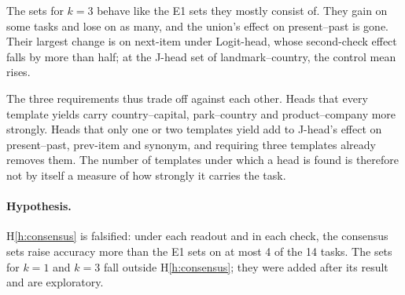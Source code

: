 \documentclass[11pt,a4paper]{article}
\begin{document}
The sets for $k=3$ behave like the E1 sets they mostly consist of. They gain on some tasks and lose on as many, and the union's effect on present--past is gone. Their largest change is on next-item under Logit-head, whose second-check effect falls by more than half; at the J-head set of landmark--country, the control mean rises.

The three requirements thus trade off against each other. Heads that every template yields carry country--capital, park--country and product--company more strongly. Heads that only one or two templates yield add to J-head's effect on present--past, prev-item and synonym, and requiring three templates already removes them. The number of templates under which a head is found is therefore not by itself a measure of how strongly it carries the task.

\paragraph{Hypothesis.} H\ref{h:consensus} is falsified: under each readout and in each check, the consensus sets raise accuracy more than the E1 sets on at most 4 of the 14 tasks. The sets for $k=1$ and $k=3$ fall outside H\ref{h:consensus}; they were added after its result and are exploratory.

\begin{table}[tbp]
\centering\footnotesize\setlength{\tabcolsep}{3pt}

\caption{E1b: rule-style head sets under Logit-head (L) and J-head (J): from the most accurate instruction template (E1, Table~\ref{tab:heads-simple}), and the heads that meet Definition~\ref{def:lth} under at least $k$ of the five templates. Each cell: number of heads and, in brackets, its share of the model's 1,024 heads in \%. Distinct: heads in the set of at least one task. The set for $k=1$ contains the E1 set and the set for $k=5$ is contained in it; of the heads in the sets for $k=3$, summed over tasks, 198 of 227 (L) and 300 of 343 (J) are in the E1 sets.}
\label{tab:heads-consensus}
\end{table}

\begin{table}[tbp]
\centering\footnotesize

\caption{E1b, first causal check: causal effect of the rule-style head sets of Table~\ref{tab:heads-consensus} with rule-style means, as in Table~\ref{tab:effects-simple}; 100 patched items per task. --: empty set.}
\label{tab:effects-consensus}
\end{table}
\end{document}
